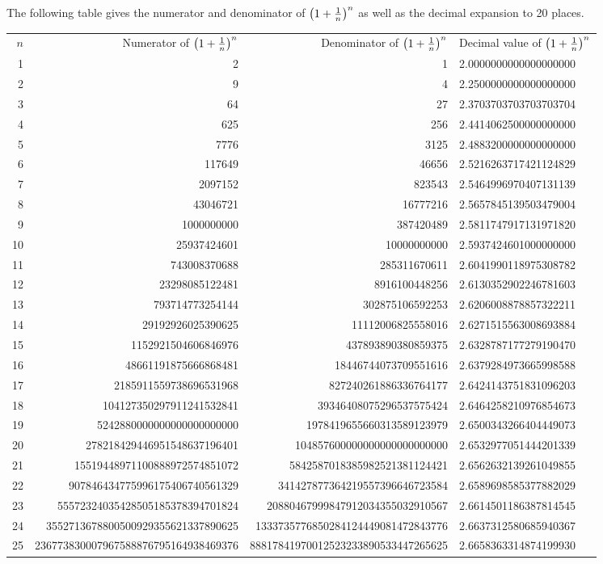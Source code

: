 \documentclass[12pt]{article}
\begin{document}
The following table gives the numerator and denominator of $\left( 1 + {1 \over n} \right)^n$ as well as the decimal expansion to 20 places.

\begin{tabular}{|r|r|r|l|}
$n$ & Numerator of $\left( 1 + {1 \over n} \right)^n$ & Denominator of $\left( 1 + {1 \over n} \right)^n$ & Decimal value of $\left( 1 + {1 \over n} \right)^n$ \\
1 & 2 & 1 & 2.0000000000000000000 \\ 
2 & 9 & 4 & 2.2500000000000000000 \\ 
3 & 64 & 27 & 2.3703703703703703704 \\ 
4 & 625 & 256 & 2.4414062500000000000 \\ 
5 & 7776 & 3125 & 2.4883200000000000000 \\ 
6 & 117649 & 46656 & 2.5216263717421124829 \\ 
7 & 2097152 & 823543 & 2.5464996970407131139 \\ 
8 & 43046721 & 16777216 & 2.5657845139503479004 \\ 
9 & 1000000000 & 387420489 & 2.5811747917131971820 \\ 
10 & 25937424601 & 10000000000 & 2.5937424601000000000 \\ 
11 & 743008370688 & 285311670611 & 2.6041990118975308782 \\ 
12 & 23298085122481 & 8916100448256 & 2.6130352902246781603 \\ 
13 & 793714773254144 & 302875106592253 & 2.6206008878857322211 \\ 
14 & 29192926025390625 & 11112006825558016 & 2.6271515563008693884 \\ 
15 & 1152921504606846976 & 437893890380859375 & 2.6328787177279190470 \\ 
16 & 48661191875666868481 & 18446744073709551616 & 2.6379284973665998588 \\ 
17 & 2185911559738696531968 & 827240261886336764177 & 2.6424143751831096203 \\ 
18 & 104127350297911241532841 & 39346408075296537575424 & 2.6464258210976854673 \\ 
19 & 5242880000000000000000000 & 1978419655660313589123979 & 2.6500343266404449073 \\ 
20 & 278218429446951548637196401 & 104857600000000000000000000 & 2.6532977051444201339 \\ 
21 & 15519448971100888972574851072 & 5842587018385982521381124421 & 2.6562632139261049855 \\ 
22 & 907846434775996175406740561329 & 341427877364219557396646723584 & 2.6589698585377882029 \\ 
23 & 55572324035428505185378394701824 & 20880467999847912034355032910567 & 2.6614501186387814545 \\ 
24 & 3552713678800500929355621337890625 & 1333735776850284124449081472843776 & 2.6637312580685940367 \\ 
25 & 236773830007967588876795164938469376 & 88817841970012523233890533447265625 & 2.6658363314874199930 \\
\end{tabular}
\end{document}
